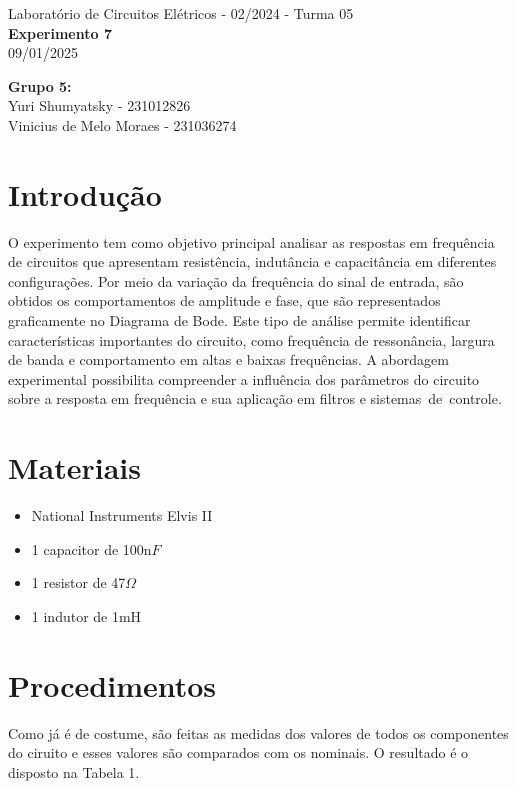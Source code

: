 \documentclass[a4 paper]{article}
\newcommand{\parag}{\hspace{30pt}}
\begin{document}
\justifying
\begin{center}{\large Laboratório de Circuitos Elétricos - 02/2024 - Turma 05}\\
{\large \textbf{Experimento 7}}\\ 
09/01/2025
\end{center}

\vspace{500pt}
 \noindent\textbf{Grupo 5:}\\
 Yuri Shumyatsky - 231012826\\
Vinicius de Melo Moraes - 231036274\\



\vspace{30pt}
\newpage

\section{Introdução}
\parag O experimento tem como objetivo principal analisar as respostas em frequência de circuitos que apresentam resistência, indutância e capacitância em diferentes configurações. Por meio da variação da frequência do sinal de entrada, são obtidos os comportamentos de amplitude e fase, que são representados graficamente no Diagrama de Bode. Este tipo de análise permite identificar características importantes do circuito, como frequência de ressonância, largura de banda e comportamento em altas e baixas frequências. A abordagem experimental possibilita compreender a influência dos parâmetros do circuito sobre a resposta em frequência e sua aplicação em filtros e sistemas de controle.

\section{Materiais}
	\begin{itemize}
	\item National Instruments Elvis II
	\item 1 capacitor de 100n$F$
	\item 1 resistor de 47$\Omega$
	\item 1 indutor de 1mH
	\end{itemize}

\newpage
\section{Procedimentos}
\parag Como já é de costume, são feitas as medidas dos valores de todos os componentes do ciruito e esses valores são comparados com os nominais. O resultado é o disposto na Tabela 1.
\end{document}
